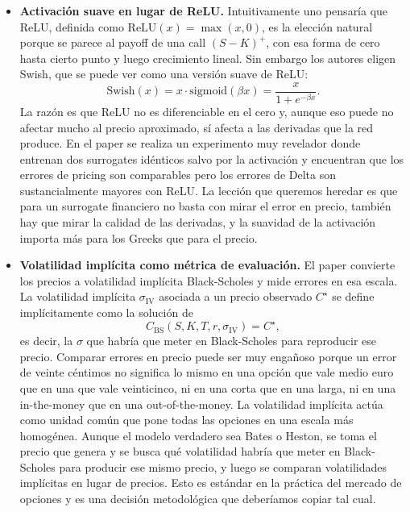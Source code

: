 \documentclass[11pt,a4paper]{article}
\begin{document}
\begin{itemize}
\item \textbf{Activación suave en lugar de ReLU.} Intuitivamente uno pensaría que ReLU, definida como $\mathrm{ReLU}(x) = \max(x, 0)$, es la elección natural porque se parece al payoff de una call $(S - K)^+$, con esa forma de cero hasta cierto punto y luego crecimiento lineal. Sin embargo los autores eligen Swish, que se puede ver como una versión suave de ReLU:
\begin{equation}
\mathrm{Swish}(x) = x \cdot \mathrm{sigmoid}(\beta x) = \frac{x}{1 + e^{-\beta x}}.
\end{equation}
La razón es que ReLU no es diferenciable en el cero y, aunque eso puede no afectar mucho al precio aproximado, sí afecta a las derivadas que la red produce. En el paper se realiza un experimento muy revelador donde entrenan dos surrogates idénticos salvo por la activación y encuentran que los errores de pricing son comparables pero los errores de Delta son sustancialmente mayores con ReLU. La lección que queremos heredar es que para un surrogate financiero no basta con mirar el error en precio, también hay que mirar la calidad de las derivadas, y la suavidad de la activación importa más para los Greeks que para el precio.

\item \textbf{Volatilidad implícita como métrica de evaluación.} El paper convierte los precios a volatilidad implícita Black-Scholes y mide errores en esa escala. La volatilidad implícita $\sigma_{\mathrm{IV}}$ asociada a un precio observado $C^\star$ se define implícitamente como la solución de
\begin{equation}
C_{\mathrm{BS}}(S, K, T, r, \sigma_{\mathrm{IV}}) = C^\star,
\end{equation}
es decir, la $\sigma$ que habría que meter en Black-Scholes para reproducir ese precio. Comparar errores en precio puede ser muy engañoso porque un error de veinte céntimos no significa lo mismo en una opción que vale medio euro que en una que vale veinticinco, ni en una corta que en una larga, ni en una in-the-money que en una out-of-the-money. La volatilidad implícita actúa como unidad común que pone todas las opciones en una escala más homogénea. Aunque el modelo verdadero sea Bates o Heston, se toma el precio que genera y se busca qué volatilidad habría que meter en Black-Scholes para producir ese mismo precio, y luego se comparan volatilidades implícitas en lugar de precios. Esto es estándar en la práctica del mercado de opciones y es una decisión metodológica que deberíamos copiar tal cual.


\end{itemize}
\end{document}
